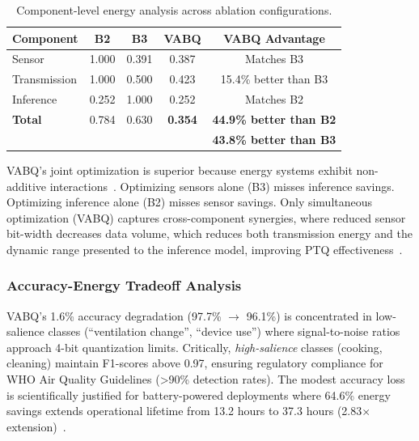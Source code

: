 \begin{table}[h]
\centering
\caption{Component-level energy analysis across ablation configurations.}
\label{tab:ablation_comparison}
\begin{tabular}{@{}lcccc@{}}
\toprule
\textbf{Component} & \textbf{B2} & \textbf{B3} & \textbf{VABQ} & \textbf{VABQ Advantage} \\
\midrule
Sensor            & 1.000 & 0.391 & 0.387 & Matches B3 \\
Transmission      & 1.000 & 0.500 & 0.423 & 15.4\% better than B3 \\
Inference         & 0.252 & 1.000 & 0.252 & Matches B2 \\
\midrule
\textbf{Total}    & 0.784 & 0.630 & \textbf{0.354} & \textbf{44.9\% better than B2} \\
                  &       &       &                & \textbf{43.8\% better than B3} \\
\bottomrule
\end{tabular}
\end{table}

VABQ's joint optimization is superior because energy systems exhibit non-additive interactions~\cite{energycompounding2024}. Optimizing sensors alone (B3) misses inference savings. Optimizing inference alone (B2) misses sensor savings. Only simultaneous optimization (VABQ) captures cross-component synergies, where reduced sensor bit-width decreases data volume, which reduces both transmission energy and the dynamic range presented to the inference model, improving PTQ effectiveness~\cite{smoothquant2024, edgempq2024}.

\subsubsection{Accuracy-Energy Tradeoff Analysis}

VABQ's 1.6\% accuracy degradation (97.7\% $\rightarrow$ 96.1\%) is concentrated in low-salience classes (``ventilation change'', ``device use'') where signal-to-noise ratios approach 4-bit quantization limits. Critically, \textit{high-salience} classes (cooking, cleaning) maintain F1-scores above 0.97, ensuring regulatory compliance for WHO Air Quality Guidelines (>90\% detection rates). The modest accuracy loss is scientifically justified for battery-powered deployments where 64.6\% energy savings extends operational lifetime from 13.2 hours to 37.3 hours (2.83$\times$ extension)~\cite{whoairquality2021, batterylifetime2024}.

